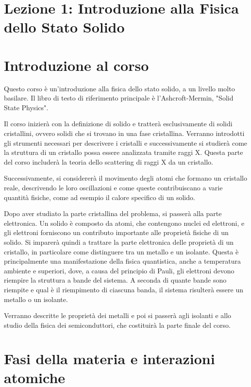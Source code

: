 
\section{Lezione 1: Introduzione alla Fisica dello Stato Solido}
\label{appendix:lesson01}

\section*{Introduzione al corso}

Questo corso è un'introduzione alla fisica dello stato solido, a un livello molto basilare. Il libro di testo di riferimento principale è l'Ashcroft-Mermin, "Solid State Physics".

Il corso inizierà con la definizione di solido e tratterà esclusivamente di solidi cristallini, ovvero solidi che si trovano in una fase cristallina. Verranno introdotti gli strumenti necessari per descrivere i cristalli e successivamente si studierà come la struttura di un cristallo possa essere analizzata tramite raggi X. Questa parte del corso includerà la teoria dello scattering di raggi X da un cristallo.

Successivamente, si considererà il movimento degli atomi che formano un cristallo reale, descrivendo le loro oscillazioni e come queste contribuiscano a varie quantità fisiche, come ad esempio il calore specifico di un solido.

Dopo aver studiato la parte cristallina del problema, si passerà alla parte elettronica. Un solido è composto da atomi, che contengono nuclei ed elettroni, e gli elettroni forniscono un contributo importante alle proprietà fisiche di un solido. Si imparerà quindi a trattare la parte elettronica delle proprietà di un cristallo, in particolare come distinguere tra un metallo e un isolante. Questa è principalmente una manifestazione della fisica quantistica, anche a temperatura ambiente e superiori, dove, a causa del principio di Pauli, gli elettroni devono riempire la struttura a bande del sistema. A seconda di quante bande sono riempite e qual è il riempimento di ciascuna banda, il sistema risulterà essere un metallo o un isolante.

Verranno descritte le proprietà dei metalli e poi si passerà agli isolanti e allo studio della fisica dei semiconduttori, che costituirà la parte finale del corso.

\section*{Fasi della materia e interazioni atomiche}

